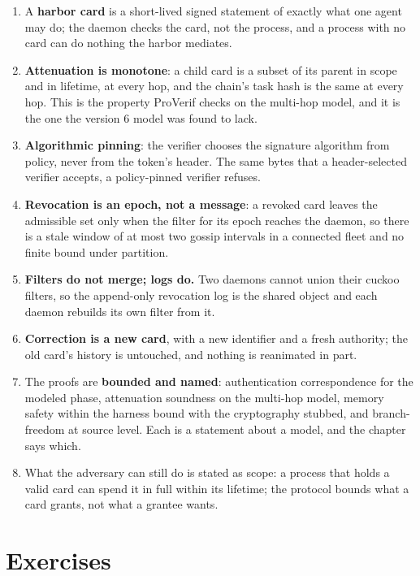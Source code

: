\documentclass[11pt,a4paper]{article}
\theoremstyle{definition}
\begin{document}
\begin{enumerate}[leftmargin=1.6em,itemsep=2pt]
\item A \textbf{harbor card} is a short-lived signed statement of exactly what one agent may do; the daemon checks the card, not the process, and a process with no card can do nothing the harbor mediates.
\item \textbf{Attenuation is monotone}: a child card is a subset of its parent in scope and in lifetime, at every hop, and the chain's task hash is the same at every hop. This is the property ProVerif checks on the multi-hop model, and it is the one the version 6 model was found to lack.
\item \textbf{Algorithmic pinning}: the verifier chooses the signature algorithm from policy, never from the token's header. The same bytes that a header-selected verifier accepts, a policy-pinned verifier refuses.
\item \textbf{Revocation is an epoch, not a message}: a revoked card leaves the admissible set only when the filter for its epoch reaches the daemon, so there is a stale window of at most two gossip intervals in a connected fleet and no finite bound under partition.
\item \textbf{Filters do not merge; logs do.} Two daemons cannot union their cuckoo filters, so the append-only revocation log is the shared object and each daemon rebuilds its own filter from it.
\item \textbf{Correction is a new card}, with a new identifier and a fresh authority; the old card's history is untouched, and nothing is reanimated in part.
\item The proofs are \textbf{bounded and named}: authentication correspondence for the modeled phase, attenuation soundness on the multi-hop model, memory safety within the harness bound with the cryptography stubbed, and branch-freedom at source level. Each is a statement about a model, and the chapter says which.
\item What the adversary can still do is stated as scope: a process that holds a valid card can spend it in full within its lifetime; the protocol bounds what a card grants, not what a grantee wants.
\end{enumerate}

\section{Exercises}
\label{sec:anchor-exercises}
\end{document}
